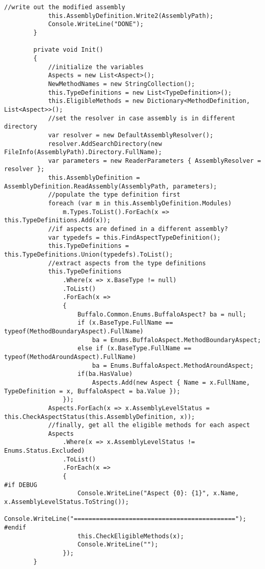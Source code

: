 \begin{lstlisting}[caption={../buffalo/Weaver.cs}, label=../buffalo/Weaver.cs, frame=tb, basicstyle=\scriptsize]
            //write out the modified assembly
            this.AssemblyDefinition.Write2(AssemblyPath);
            Console.WriteLine("DONE");
        }

        private void Init()
        {
            //initialize the variables
            Aspects = new List<Aspect>();
            NewMethodNames = new StringCollection();
            this.TypeDefinitions = new List<TypeDefinition>();
            this.EligibleMethods = new Dictionary<MethodDefinition, List<Aspect>>();
            //set the resolver in case assembly is in different directory
            var resolver = new DefaultAssemblyResolver();
            resolver.AddSearchDirectory(new FileInfo(AssemblyPath).Directory.FullName);
            var parameters = new ReaderParameters { AssemblyResolver = resolver };
            this.AssemblyDefinition = AssemblyDefinition.ReadAssembly(AssemblyPath, parameters);
            //populate the type definition first
            foreach (var m in this.AssemblyDefinition.Modules)
                m.Types.ToList().ForEach(x => this.TypeDefinitions.Add(x));
            //if aspects are defined in a different assembly?
            var typedefs = this.FindAspectTypeDefinition();
            this.TypeDefinitions = this.TypeDefinitions.Union(typedefs).ToList();
            //extract aspects from the type definitions
            this.TypeDefinitions
                .Where(x => x.BaseType != null)
                .ToList()
                .ForEach(x =>
                {
                    Buffalo.Common.Enums.BuffaloAspect? ba = null;
                    if (x.BaseType.FullName == typeof(MethodBoundaryAspect).FullName)
                        ba = Enums.BuffaloAspect.MethodBoundaryAspect;
                    else if (x.BaseType.FullName == typeof(MethodAroundAspect).FullName)
                        ba = Enums.BuffaloAspect.MethodAroundAspect;
                    if(ba.HasValue)
                        Aspects.Add(new Aspect { Name = x.FullName, TypeDefinition = x, BuffaloAspect = ba.Value });
                });
            Aspects.ForEach(x => x.AssemblyLevelStatus = this.CheckAspectStatus(this.AssemblyDefinition, x));
            //finally, get all the eligible methods for each aspect
            Aspects
                .Where(x => x.AssemblyLevelStatus != Enums.Status.Excluded)
                .ToList()
                .ForEach(x =>
                {
#if DEBUG
                    Console.WriteLine("Aspect {0}: {1}", x.Name, x.AssemblyLevelStatus.ToString());
                    Console.WriteLine("============================================");
#endif
                    this.CheckEligibleMethods(x);
                    Console.WriteLine("");
                });
        }


\end{lstlisting}
